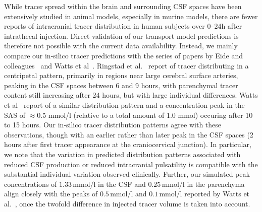 \documentclass[fleqn,10pt]{wlscirep}
\begin{document}
While tracer spread within the brain and surrounding CSF spaces have been
extensively studied in animal models, especially in murine models,
there are fewer reports of intracranial tracer distribution in human
subjects over 0--24h after intrathecal injection. Direct validation of
our transport model predictions is therefore not possible with the
current data availability. Instead, we mainly compare our in-silico
tracer predictions with the series of papers by Eide and
colleagues~\cite{ringstad2017glymphatic, ringstad2018brain,
  eide2021sleep, eide2024functional} and Watts et
al~\cite{watts2019measuring}. Ringstad et al.~\cite{ringstad2018brain}
report of tracer distributing in a centripetal pattern, primarily in
regions near large cerebral surface arteries, peaking in the CSF
spaces between 6 and 9 hours, with parenchymal tracer content still
increasing after 24 hours, but with large individual
differences. Watts et al~\cite{watts2019measuring} report of a similar
distribution pattern and a concentration peak in the SAS of
$\approx$0.5 mmol/l (relative to a total amount of 1.0 mmol) occuring
after 10 to 15 hours. Our in-silico tracer distribution patterns agree
with these observations, though with an earlier rather than later peak
in the CSF spaces (2 hours after first tracer appearance at the
craniocervical junction). In particular, we note that the variation in
predicted distribution patterns associated with reduced CSF production
or reduced intracranial pulsatility is compatible with the substantial
individual variation observed clinically. Further, our simulated peak concentrations of $1.33\,$mmol/l in the CSF and $0.25\,$mmol/l in the parenchyma align closely with the peaks of $0.5\,$mmol/l and $0.1\,$mmol/l reported by Watts et al.~\cite{watts2019measuring}, once the twofold difference in injected tracer volume is taken into account.
\end{document}
